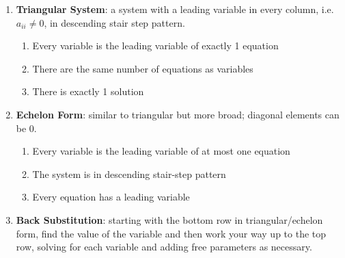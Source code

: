 \documentclass[10pt]{article}
\begin{document}
\begin{enumerate}
\item \textbf{Triangular System}: a system with a leading variable in every column, i.e. $a_{ii} \neq 0$, in descending  stair step pattern.
\begin{enumerate}
\item Every variable is the leading variable of exactly 1 equation
\item There are the same number of equations as variables
\item There is exactly 1 solution
\end{enumerate}
\item \textbf{Echelon Form}: similar to triangular but more broad; diagonal elements can be 0.
\begin{enumerate}
\item Every variable is the leading variable of at most one equation
\item The system is in descending stair-step pattern
\item Every equation has a leading variable
\end{enumerate}
\item \textbf{Back Substitution}: starting with the bottom row in triangular/echelon form, find the value of the variable and then work your way up to the top row, solving for each variable and adding free parameters as necessary.
\end{enumerate}
\end{document}

